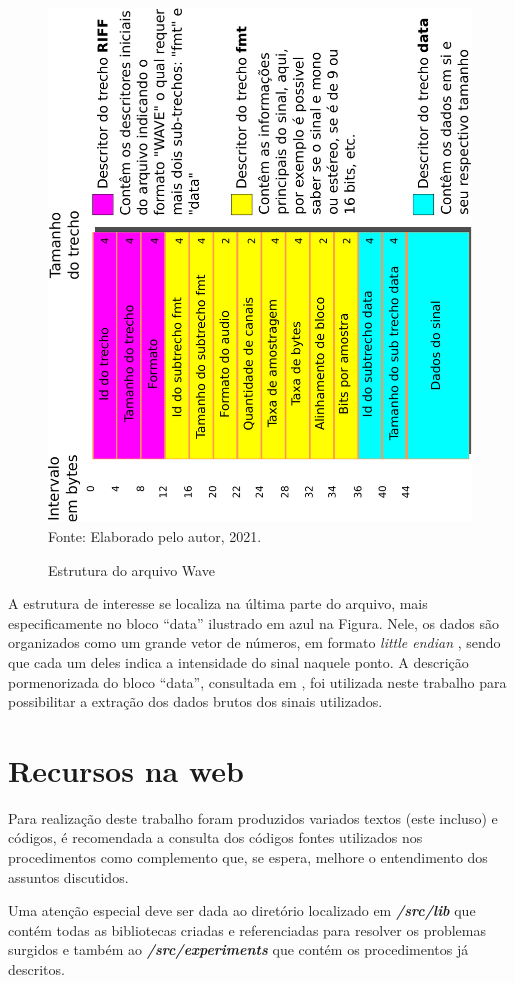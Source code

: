 \begin{apendicesenv}
		\begin{figure}[h]
			\centering
			\caption{Estrutura do arquivo Wave}
			\includegraphics[width=0.6\linewidth, angle=-90]{images/wavePcmStructure.pdf}
			\label{fig:wavePcmStructure}
			\\Fonte: Elaborado pelo autor, 2021.
		\end{figure}
		
		\par A estrutura de interesse se localiza na última parte do arquivo, mais especificamente no bloco ``data'' ilustrado em azul na Figura. Nele, os dados são organizados como um grande vetor de números, em formato \textit{little endian} \cite{adiga2007writing}, sendo que cada um deles indica a intensidade do sinal naquele ponto. A descrição pormenorizada do bloco ``data'', consultada em \cite{microsoftIbmWaveSpec}, foi utilizada neste trabalho para possibilitar a extração dos dados brutos dos sinais utilizados. 

	\chapter{Recursos na web}
		\par Para realização deste trabalho foram produzidos variados textos (este incluso) e códigos, é recomendada a consulta dos códigos fontes utilizados nos procedimentos como complemento que, se espera, melhore o entendimento dos assuntos discutidos.
		
		\par Uma atenção especial deve ser dada ao diretório localizado em \textit{\textbf{/src/lib}} que contém todas as bibliotecas criadas e referenciadas para resolver os problemas surgidos e também ao \textit{\textbf{/src/experiments}} que contém os procedimentos já descritos.
				

\end{apendicesenv}
